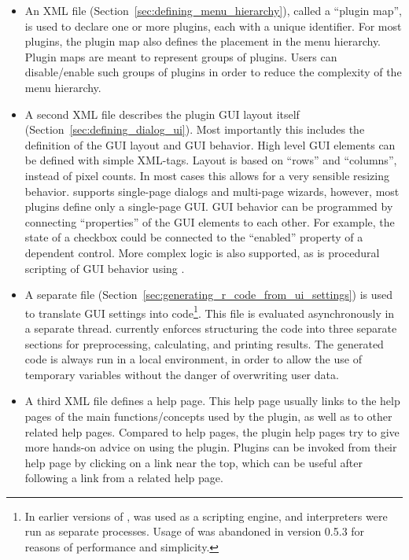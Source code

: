 \begin{itemize}
    \item
    An XML file (Section~\ref{sec:defining_menu_hierarchy}), 
    called a ``plugin map'', is used to declare one or more plugins, each
    with a unique identifier. For most plugins, the plugin map also defines the
    placement in the menu hierarchy. Plugin maps are meant to represent groups of
    plugins. Users can disable/enable such groups of plugins in order to reduce the
    complexity of the menu hierarchy.

    \item
    A second XML file describes the plugin GUI layout itself (Section~\ref{sec:defining_dialog_ui}). 
    Most importantly this includes
    the definition of the GUI layout and GUI behavior. High level GUI elements can
    be defined with simple XML-tags. Layout is based on ``rows'' and ``columns'',
    instead of pixel counts. In most cases this allows for a very sensible resizing
    behavior.  supports single-page dialogs and multi-page wizards, however,
    most plugins define only a single-page GUI. GUI behavior can be programmed by
    connecting ``properties'' of the GUI elements to each other. For example, the state
    of a checkbox could be connected to the ``enabled'' property of a dependent
    control. More complex logic is also supported, as is procedural scripting of GUI
    behavior using .

    \item
    A separate  file (Section~\ref{sec:generating_r_code_from_ui_settings}) 
    is used to translate GUI settings into 
    code\footnote{
        In earlier versions of ,  was used
        as a scripting engine, and  interpreters were run as separate processes.
        Usage of  was abandoned in  version 0.5.3 for reasons of performance and simplicity.
    }. This  file is evaluated asynchronously in a separate thread. 
    currently enforces structuring the code into three separate sections for
    preprocessing, calculating, and printing results. The generated code is always
    run in a local environment, in order to allow the use of temporary variables
    without the danger of overwriting user data.

    \item
    A third XML file defines a help page. This help page usually links to the  help
    pages of the main functions/concepts used by the plugin, as well as to other
    related  help pages. Compared to  help
    pages, the plugin help pages try to give more hands-on advice on using the
    plugin. Plugins can be invoked from their help page by clicking on a link near
    the top, which can be useful after following a link from a related help page.
\end{itemize}

